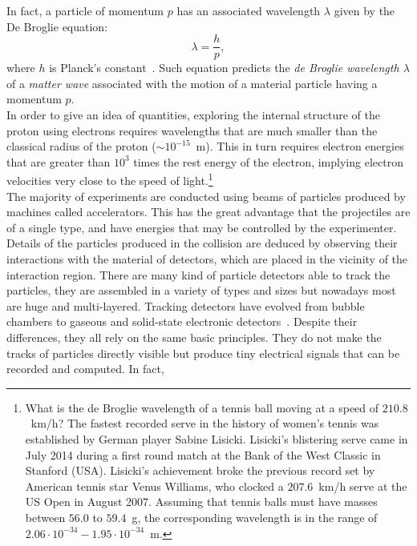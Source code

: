 In fact, a particle of momentum $p$ has an associated wavelength $\lambda$ given
by the De Broglie equation:
\begin{equation}
  \label{eqn:planck}
  \lambda=\frac{h}{p} ,
\end{equation}
where $h$ is Planck's constant~\cite{Griffiths}. Such equation predicts the {\it
  de Broglie wavelength $\lambda$} of a {\it matter wave} associated
with the motion of a material particle having a momentum $p$.\\
In order to give an idea of quantities, exploring the internal structure of the
proton using electrons requires wavelengths that are much smaller than the
classical radius of the proton ($\sim 10^{-15}$~m). This in turn requires
electron energies that are greater than $10^3$ times the rest energy of the
electron, implying electron velocities very close to the speed of
light.\footnote{What is the de Broglie wavelength of a tennis ball moving at a
  speed of $210.8$~km/h? The fastest recorded serve in the history of women's
  tennis was established by German player Sabine Lisicki. Lisicki's blistering
  serve came in July 2014 during a first round match at the Bank of the West
  Classic in Stanford (USA). Lisicki's achievement broke the previous record set
  by American tennis star Venus Williams, who clocked a $207.6$~km/h serve at
  the US Open in August 2007. Assuming that tennis balls must have masses
  between $56.0$ to $59.4$~g, the corresponding
  wavelength is in the range of $2.06 \cdot 10^{-34} - 1.95 \cdot 10^{-34}$~m.}\\
The majority of experiments are conducted using beams of particles produced by
machines called accelerators. This has the great advantage that the projectiles
are of a single type, and have energies that may be controlled by the
experimenter. Details of the particles produced in the collision are deduced by
observing their interactions with the material of detectors, which are placed in
the vicinity of the interaction region. There are many kind of particle
detectors able to track the particles, they are assembled in a variety of types
and sizes but nowadays most are huge and multi-layered. Tracking detectors have
evolved from bubble chambers to gaseous and solid-state electronic
detectors~\cite{Strandlie}. Despite their differences, they all rely on the same
basic principles. They do not make the tracks of particles directly visible but
produce tiny electrical signals that can be recorded and computed. In fact,
